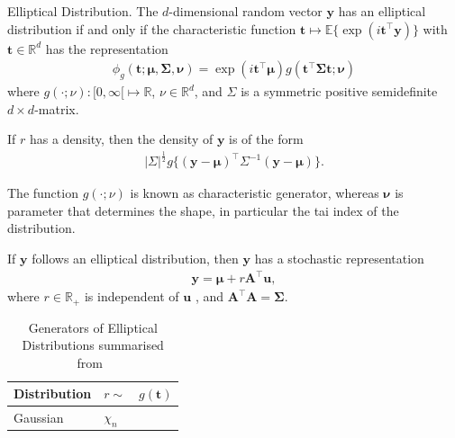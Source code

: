 \clearpage%

\begin{definition}
  Elliptical Distribution.  The $d$-dimensional random vector
  $\pmb{y}$ has an elliptical distribution if and only if the
  characteristic function
  $\pmb{t} \mapsto \mathbb{E}\{\exp(i\pmb{t}^\top \pmb{y})\}$ with
  $\pmb{t} \in \mathbb{R}^d$ has the representation
  \begin{align}
    \phi_g(\pmb{t}; \pmb{\mu}, \pmb{\Sigma}, \pmb{\nu}) = \exp(i\pmb{t}^\top\pmb{\mu})g(\pmb{t}^\top\pmb{\Sigma}\pmb{t};\pmb{\nu})
  \end{align}
  where $g(\cdot;\nu):[0, \infty[ \mapsto \mathbb{R}$,
  $\nu \in \mathbb{R}^d$, and $\Sigma$ is a symmetric positive
  semidefinite $d\times d$-matrix.
\end{definition}

If $r$ has a density, then the density of $\pmb{y}$ is of the form
\begin{align}
  |\Sigma|^{\frac{1}{2}} g\{(\pmb{y} - \pmb{\mu})^\top \Sigma^{-1}(\pmb{y} - \pmb{\mu})\}.
\end{align}

The function $g(\cdot; \nu)$ is known as characteristic generator,
whereas $\pmb{\nu}$ is parameter that determines the shape, in
particular the tai index of the distribution.





\begin{corollary} \citep[equation 2.12]{fang2018symmetric} If
  $\pmb{y}$ follows an elliptical distribution, then $\pmb{y}$ has a
  stochastic representation
  \begin{align}\label{eq:stochastic-representation}
    \pmb{y} = \pmb{\mu} + r\pmb{A}^\top \pmb{u},
  \end{align}
  where $r \in \mathbb{R}_+$ is independent of $\pmb{u}$
  , and $\pmb{A}^\top\pmb{A}=\pmb{\Sigma}$.
\end{corollary}

\begin{table}[ht]
  \center
  \begin{tabular}{lll}
    Distribution & $r \sim$ & $g(\pmb{t})$\\ \hline
    Gaussian & $\chi_n$ &
  \end{tabular}
  \caption{Generators of Elliptical Distributions summarised
    from~\cite[Chapter 2]{fang2018symmetric}}
  \label{tab:table}
\end{table}


